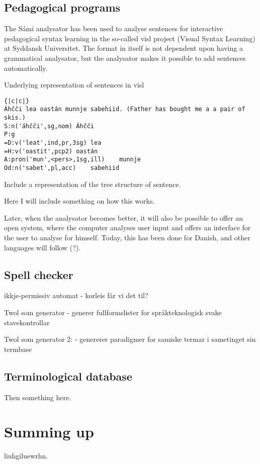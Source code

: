 \documentclass[a4paper,english]{article}
\begin{document}
\subsection{Pedagogical programs}\label{ped}

The Sámi analysator has been used to analyse sentences for interactive pedagogical syntax learning in the so-called visl project (Visual Syntax Learning) at Syddansk Universitet. The format in itself is not dependent upon having a grammatical analysator, but the analysator makes it possible to add sentences automatically. 

\begin{table}[htdp]
\caption{Underlying representation of sentences in visl}
\begin{center}
\begin{verbatim}{|c|c|}
Áhčči lea oastán munnje sabehiid. (Father has bought me a a pair of skis.)
S:n('áhčči',sg,nom)	Áhčči
P:g
=D:v('leat',ind,pr,3sg)	lea
=H:v('oastit',pcp2)	oastán
A:pron('mun',<pers>,1sg,ill)	munnje
Od:n('sabet',pl,acc)	sabehiid
\end{verbatim}
\end{center}
\label{underlying}
\end{table}%


Include a representation of the tree structure of sentence.


Here I will include something on how this works.

Later, when the analysator becomes better, it will also be possible to offer an open system, where the computer analyses user input and offers an interface for the user to analyse for himself. Today, this has been done for Danish, and other languages will follow (?).



\subsection{Spell checker}\label{spell}


ikkje-permissiv automat - korleis får vi det til?

Twol som generator - generer fullformslister for språkteknologisk svake stavekontrollar

Twol som generator 2: - genererer paradigmer for samiske termar i sametinget sin termbase

\subsection{Terminological database}\label{term}

Then something here.

\section{Summing up}

liuhgiluewrhn.

 



\end{document}
